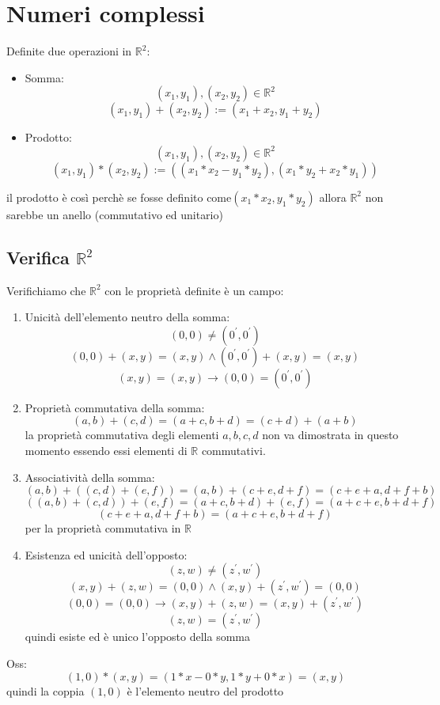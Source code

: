 \documentclass[a4paper,12pt]{article}
\begin{document}
	\section{Numeri complessi}
	Definite due operazioni in $\mathbb{R}^2$:
	\begin{itemize}
		\item Somma:
		\[(x_1, y_1), (x_2, y_2) \in \mathbb{R}^2\]
		\[(x_1, y_1) + (x_2, y_2) := (x_1 + x_2, y_1 + y_2)\]
		\item Prodotto:
		\[(x_1, y_1), (x_2, y_2) \in \mathbb{R}^2\]
		\[(x_1, y_1) * (x_2, y_2) := ((x_1 * x_2 - y_1*y_2), (x_1 * y_2 + x_2 * y_1))\]
	\end{itemize}
	il prodotto è così perchè se fosse definito come$(x_1 * x_2 , y_1 * y_2)$ allora $\mathbb{R}^2$ non sarebbe un anello (commutativo ed unitario)
	
	\subsection{Verifica $\mathbb{R}^2$}
	Verifichiamo che $\mathbb{R}^2$ con le proprietà definite è un campo:
	\begin{enumerate}
		\item Unicità dell'elemento neutro della somma:
		\[(0, 0) \not = (0^\prime, 0^\prime)\]
		\[(0, 0) + (x, y) = (x,y) \wedge (0^\prime, 0^\prime) + (x, y) = (x, y)\]
		\[(x, y) = (x, y) \rightarrow (0, 0) = (0^\prime, 0^\prime)\]
		\item Proprietà commutativa della somma:
		\[(a, b) + (c, d) = (a + c, b + d) = (c + d) + (a + b)\]
		la proprietà commutativa degli elementi $a,b,c,d$ non va dimostrata in questo momento essendo essi elementi di $\mathbb{R}$ commutativi.
		\item Associatività della somma:
		\[(a, b) + ((c, d) + (e, f)) = (a, b) + (c + e, d + f) = (c + e + a, d + f+ b)\]
		\[((a,b) +  (c, d)) + (e, f) = (a + c, b + d) + (e, f) = (a + c + e, b + d + f)\]
		\[(c + e + a, d + f+ b) = (a + c + e, b + d + f)\]
		per la proprietà commutativa in $\mathbb{R}$
		\item Esistenza ed unicità dell'opposto:
		\[(z, w) \not = (z^\prime, w^\prime)\]
		\[(x, y) + (z, w) = (0, 0) \wedge (x, y) + (z^\prime, w^\prime) = (0, 0)\]
		\[(0, 0) = (0, 0) \rightarrow (x, y) + (z, w) = (x, y) + (z^\prime, w^\prime)\]
		\[(z, w) = (z^\prime, w^\prime)\]
		quindi esiste ed è unico l'opposto della somma
	\end{enumerate}
	
	Oss: 
	\[(1, 0) * (x, y) = (1 * x - 0 * y, 1 * y + 0 * x) = (x, y)\]
	quindi la coppia $(1, 0)$ è l'elemento neutro del prodotto
	
\end{document}
